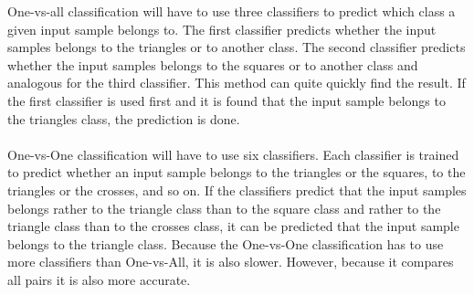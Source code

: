 \noindent One-vs-all classification will have to use three classifiers to predict which class a given input sample belongs to. The first classifier predicts whether the input samples belongs to the triangles or to another class. The second classifier predicts whether the input samples belongs to the squares or to another class and analogous for the third classifier. This method can quite quickly find the result. If the first classifier is used first and it is found that the input sample belongs to the triangles class, the prediction is done. \cite{multiclass} \\\\
One-vs-One classification will have to use six classifiers. Each classifier is trained to predict whether an input sample belongs to the triangles or the squares, to the triangles or the crosses, and so on. If the classifiers predict that the input samples belongs rather to the triangle class than to the square class and rather to the triangle class than to the crosses class, it can be predicted that the input sample belongs to the triangle class. Because the One-vs-One classification has to use more classifiers than One-vs-All, it is also slower. However, because it compares all pairs it is also more accurate. \cite{multiclass}


